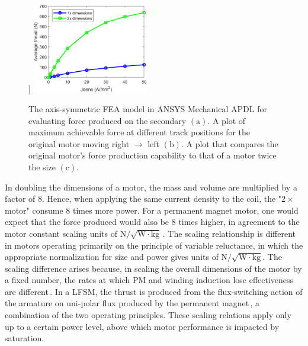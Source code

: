 \begin{figure}[!ht]
                    ]{
                    \includegraphics[width=0.45\textwidth]{chap4/images2/LFSM_scaling_effect.png}
                }
                \caption{ 
                    \label{fig:hap/rsm/LFSM/periodic_fea} The axis-symmetric \acs{FEA} model in ANSYS Mechanical APDL for evaluating force produced on the secondary $\mathrm{(a)}$. 
                    A plot of maximum achievable force at different track positions for
                    the original motor moving right $\rightarrow$ left $\mathrm{(b)}$.
                    A plot that compares the original motor's force production capability to that of a motor twice the size $\mathrm{(c)}$.
                }
            \end{figure}
    
        
            In doubling the dimensions of a motor, the mass and volume are multiplied by a factor of $8$. Hence, when applying the same current density to the coil, the "$2\times$ motor" consume $8$ times more power. For a permanent magnet motor, one would expect that the force produced would also be $8$ times higher, in agreement to the motor constant scaling units of $\mathrm{N/\sqrt{W\cdot kg}}$\,\cite{Ruddy2011DesignMotors}. The scaling relationship is different in motors operating primarily on the principle of variable reluctance, in which the appropriate normalization for size and power gives units of $\mathrm{N/\sqrt{W\cdot kg}}$. The scaling difference arises because, in scaling the overall dimensions of the motor by a fixed number, the rates at which PM and winding induction lose effectiveness are different\,\cite{Melcher1981ContinuumElectromechanics}. In a \acs{LFSM}, the thrust is produced from the flux-switching action of the armature on uni-polar flux produced by the permanent magnet\,\cite{Cheng2011}, a combination of the two operating principles. These scaling relations apply only up to a certain power level, above which motor performance is impacted by saturation.  
    
